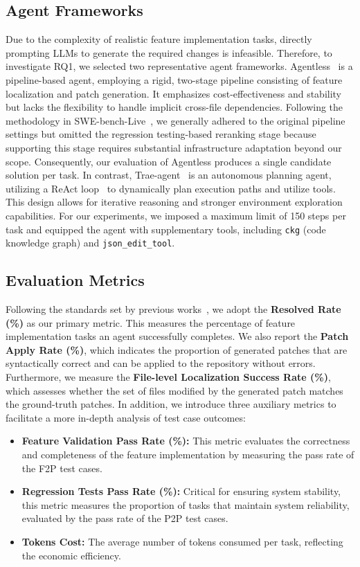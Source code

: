 \subsection{Agent Frameworks}
Due to the complexity of realistic feature implementation tasks, directly prompting LLMs to generate the required changes is infeasible. Therefore, to investigate RQ1, we selected two representative agent frameworks.
Agentless~\cite{agentless} is a pipeline-based agent, employing a rigid, two-stage pipeline consisting of feature localization and patch generation. It emphasizes cost-effectiveness and stability but lacks the flexibility to handle implicit cross-file dependencies. Following the methodology in SWE-bench-Live~\cite{swebenchgoeslive}, we generally adhered to the original pipeline settings but omitted the regression testing-based reranking stage because supporting this stage requires substantial infrastructure adaptation beyond our scope. Consequently, our evaluation of Agentless produces a single candidate solution per task. In contrast, Trae-agent~\cite{traeagent} is an autonomous planning agent, utilizing a ReAct loop~\cite{yao2022react} to dynamically plan execution paths and utilize tools. This design allows for iterative reasoning and stronger environment exploration capabilities. For our experiments, we imposed a maximum limit of 150 steps per task and equipped the agent with supplementary tools, including \texttt{ckg} (code knowledge graph) and \texttt{json\_edit\_tool}.

\subsection{Evaluation Metrics}
Following the standards set by previous works~\cite{swebench, deng2025nocode}, we adopt the \textbf{Resolved Rate (\%)} as our primary metric.
This measures the percentage of feature implementation tasks an agent successfully completes. 
We also report the \textbf{Patch Apply Rate (\%)}, which indicates the proportion of generated patches that are syntactically correct and can be applied to the repository without errors.
Furthermore, we measure the \textbf{File-level Localization Success Rate (\%)}, which assesses whether the set of files modified by the generated patch matches the ground-truth patches.
In addition, we introduce three auxiliary metrics to facilitate a more in-depth analysis of test case outcomes:
\begin{itemize}
    \item \textbf{Feature Validation Pass Rate (\%):} This metric evaluates the correctness and completeness of the feature implementation by measuring the pass rate of the F2P test cases.
    \item \textbf{Regression Tests Pass Rate (\%):} Critical for ensuring system stability, this metric measures the proportion of tasks that maintain system reliability, evaluated by the pass rate of the P2P test cases.
    \item \textbf{Tokens Cost:} The average number of tokens consumed per task, reflecting the economic efficiency.
\end{itemize}

